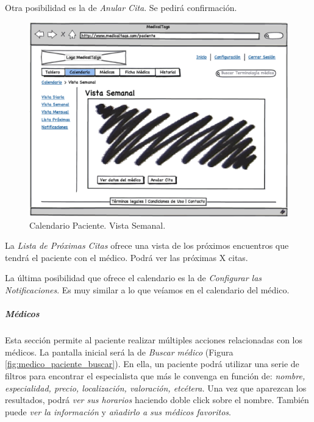 \documentclass[a4paper,oneside,11pt]{book}
\begin{document}
		Otra posibilidad es la de \textit{Anular Cita}. Se pedirá confirmación.			
		
		
		\begin{figure}[H]
		  \centering
		    \includegraphics[width=12cm]{img/eps/27_Calendario_Paciente.eps}
		  \caption{Calendario Paciente. Vista Semanal.}
		  \label{fig:calendario_vista_semanal_paciente}
		\end{figure}
		
		La \textit{Lista de Próximas Citas} ofrece una vista de los próximos encuentros que tendrá el paciente con el médico. Podrá ver las próximas X citas.		
		
		La última posibilidad que ofrece el calendario es la de \textit{Configurar las Notificaciones}. Es muy similar a lo que veíamos en el calendario del médico. 	
		
		
		\subparagraph{Médicos} %
		\label{par:paciente_medicos}
		
			Esta sección permite al paciente realizar múltiples acciones relacionadas con los médicos. La pantalla inicial será la de \textit{Buscar médico} (Figura \ref{fig:medico_paciente_buscar}). En ella, un paciente podrá utilizar una serie de filtros para encontrar el especialista que más le convenga en función de: \textit{nombre, especialidad, precio, localización, valoración, etcétera.} Una vez que aparezcan los resultados, podrá \textit{ver sus horarios} haciendo doble click sobre el nombre. También puede \textit{ver la información} y \textit{añadirlo a sus médicos favoritos}. 
			
\end{document}

